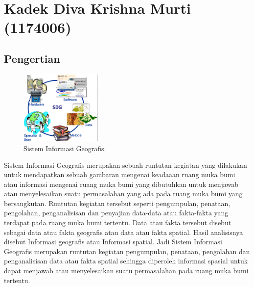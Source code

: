 \section{Kadek Diva Krishna Murti (1174006)}
\subsection{Pengertian}
\begin{figure}[H]
	\includegraphics[width=4cm]{figures/1174006/1174006sig1.png}
	\centering
	\caption{Sistem Informasi Geografis.}
\end{figure}
Sistem Informasi Geografis merupakan sebuah runtutan kegiatan yang dilakukan untuk mendapatkan sebuah gambaran mengenai keadaaan ruang muka bumi atau informasi mengenai ruang muka bumi yang dibutuhkan untuk menjawab atau menyelesaikan suatu permasalahan yang ada pada ruang muka bumi yang bersangkutan. Runtutan kegiatan tersebut seperti pengumpulan, penataan, pengolahan, penganalisisan dan penyajian data-data atau fakta-fakta yang terdapat pada ruang muka bumi tertentu. Data atau fakta tersebut disebut sebagai data atau fakta geografis atau data atau fakta spatial. Hasil analisisnya disebut Informasi geografis atau Informasi spatial. Jadi Sistem Informasi Geografis merupakan runtutan kegiatan pengumpulan, penataan, pengolahan dan penganalisisan data atau fakta spatial sehingga diperoleh informasi spasial untuk dapat menjawab atau menyelesaikan suatu permasalahan pada ruang muka bumi tertentu.
